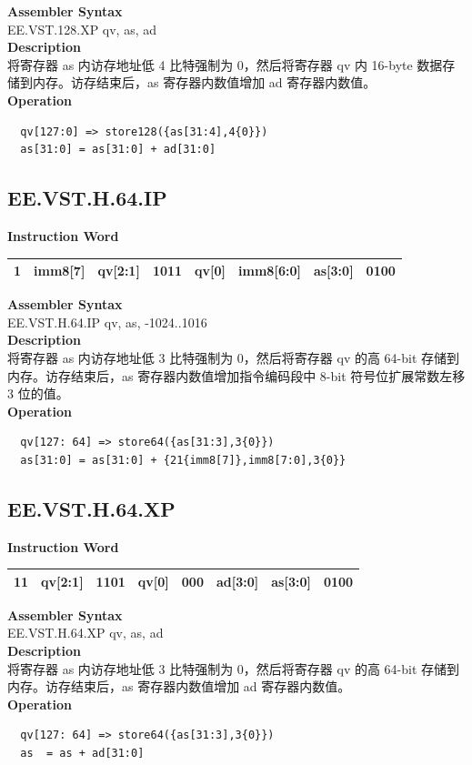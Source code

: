 \textbf{Assembler Syntax} \\
EE.VST.128.XP qv, as, ad \\
\textbf{Description} \\
将寄存器 as 内访存地址低 4 比特强制为 0，然后将寄存器 qv 内 16-byte 数据存储到内存。访存结束后，as 寄存器内数值增加 ad 寄存器内数值。\\
\textbf{Operation}
\begin{lstlisting}
  qv[127:0] => store128({as[31:4],4{0}})
  as[31:0] = as[31:0] + ad[31:0]
\end{lstlisting}

\clearpage
\subsection{EE.VST.H.64.IP}\label{instruction:EEVSTH64IP}
\setlength\tabcolsep{6pt}
\textbf{Instruction Word} \\
\begin{tabular}{|c|c|c|c|c|c|c|c|}
	\hline
	1 & imm8[7] & qv[2:1] & 1011 & qv[0] & imm8[6:0] & as[3:0] & 0100 \\
	\hline
\end{tabular}

\textbf{Assembler Syntax} \\
EE.VST.H.64.IP qv, as, -1024..1016 \\
\textbf{Description} \\
将寄存器 as 内访存地址低 3 比特强制为 0，然后将寄存器 qv 的高 64-bit 存储到内存。访存结束后，as 寄存器内数值增加指令编码段中 8-bit 符号位扩展常数左移 3 位的值。\\
\textbf{Operation}
\begin{lstlisting}
  qv[127: 64] => store64({as[31:3],3{0}})
  as[31:0] = as[31:0] + {21{imm8[7]},imm8[7:0],3{0}}
\end{lstlisting}

\clearpage
\subsection{EE.VST.H.64.XP}\label{instruction:EEVSTH64XP}
\setlength\tabcolsep{6pt}
\textbf{Instruction Word} \\
\begin{tabular}{|c|c|c|c|c|c|c|c|}
	\hline
	11 & qv[2:1] & 1101 & qv[0] & 000 & ad[3:0] & as[3:0] & 0100 \\
	\hline
\end{tabular}

\textbf{Assembler Syntax} \\
EE.VST.H.64.XP qv, as, ad \\
\textbf{Description} \\
将寄存器 as 内访存地址低 3 比特强制为 0，然后将寄存器 qv 的高 64-bit 存储到内存。访存结束后，as 寄存器内数值增加 ad 寄存器内数值。\\
\textbf{Operation}
\begin{lstlisting}
  qv[127: 64] => store64({as[31:3],3{0}})
  as  = as + ad[31:0]
\end{lstlisting}

